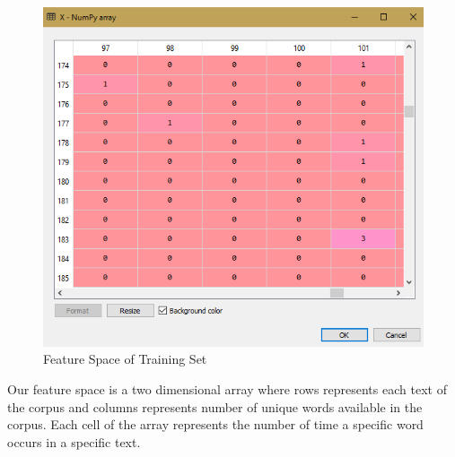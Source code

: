 \par\noindent
\begin{figure}[h!]
    \centering
    \includegraphics[scale=0.9]{Figures/feature.PNG}
    \caption{Feature Space of Training Set}
    \label{fig:feature}
\end{figure}
\par\noindent
Our feature space is a two dimensional array where rows represents each text of the corpus and columns represents number of unique words available in the corpus. Each cell of the array represents the number of time a specific word occurs in a specific text. 
